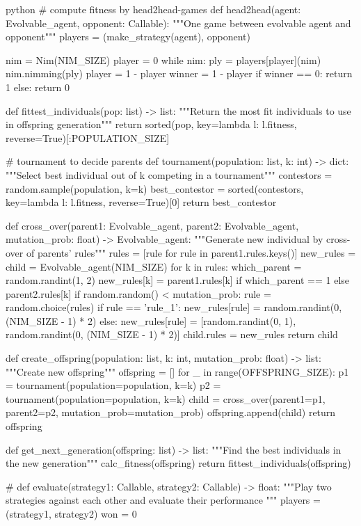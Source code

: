 \begin{mintedbox}{python}
# compute fitness by head2head-games
def head2head(agent: Evolvable_agent, opponent: Callable):
    """One game between evolvable agent and opponent"""
    players = (make_strategy(agent), opponent)

    nim = Nim(NIM_SIZE)
    player = 0
    while nim:
        ply = players[player](nim)
        nim.nimming(ply)
        player = 1 - player
    winner = 1 - player
    if winner == 0:
        return 1
    else:
        return 0

def fittest_individuals(pop: list) -> list:
    """Return the most fit individuals to use in offspring generation"""
    return sorted(pop, key=lambda l: l.fitness, reverse=True)[:POPULATION_SIZE]


# tournament to decide parents
def tournament(population: list, k: int) -> dict:
    """Select best individual out of k competing in a tournament"""
    contestors = random.sample(population, k=k)
    best_contestor = sorted(contestors, key=lambda l: l.fitness, reverse=True)[0]
    return best_contestor


def cross_over(parent1: Evolvable_agent, parent2: Evolvable_agent, mutation_prob: float) -> Evolvable_agent:
    """Generate new individual by cross-over of parents' rules"""
    rules = [rule for rule in parent1.rules.keys()]
    new_rules = {}
    child = Evolvable_agent(NIM_SIZE)
    for k in rules:
        which_parent = random.randint(1, 2)
        new_rules[k] = parent1.rules[k] if which_parent == 1 else parent2.rules[k]
    if random.random() < mutation_prob:
        rule = random.choice(rules)
        if rule == 'rule_1':
            new_rules[rule] = random.randint(0, (NIM_SIZE - 1) * 2)
        else:
            new_rules[rule] = [random.randint(0, 1), random.randint(0, (NIM_SIZE - 1) * 2)]
    child.rules = new_rules
    return child


def create_offspring(population: list, k: int, mutation_prob: float) -> list:
    """Create new offspring"""
    offspring = []
    for _ in range(OFFSPRING_SIZE):
        p1 = tournament(population=population, k=k)
        p2 = tournament(population=population, k=k)
        child = cross_over(parent1=p1, parent2=p2, mutation_prob=mutation_prob)
        offspring.append(child)
    return offspring


def get_next_generation(offspring: list) -> list:
    """Find the best individuals in the new generation"""
    calc_fitness(offspring)
    return fittest_individuals(offspring)


# %
def evaluate(strategy1: Callable, strategy2: Callable) -> float:
    """Play two strategies against each other and evaluate their performance """
    players = (strategy1, strategy2)
    won = 0


\end{mintedbox}
